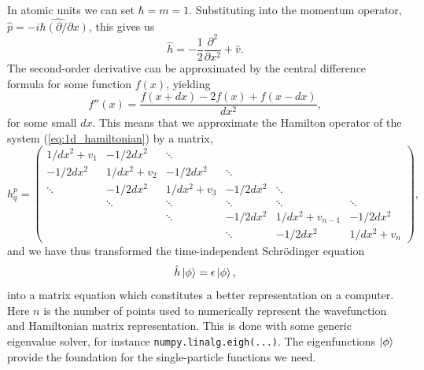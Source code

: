 In atomic units we can set $\hbar = m = 1$. Substituting into the 
momentum operator, $\hat{p} = \hat{-i\hbar (\partial / \partial x)}$, this gives us 
\begin{equation}
    \label{eq:1d_hamiltonian}
    \hat{h} = - \frac{1}{2} \frac{\partial^2}{\partial x^2} + \hat{v}.
\end{equation}
The second-order derivative can be approximated by the central difference 
formula for some function $f(x)$, yielding
\begin{equation}
    f''(x) = \frac{f(x + dx) - 2f(x) +f(x - dx)}{dx^2},
\end{equation}
for some small $dx$. This means that we approximate the Hamilton 
operator of the system (\autoref{eq:1d_hamiltonian}) by a matrix,
\begin{equation}
    h^p_q =  \begin{pmatrix}
    1/dx^2 + v_1 & -1/2dx^2 & \ddots & & & \\
    -1/2dx^2 & 1/dx^2 + v_2 & -1/2dx^2 & \ddots & & \\
    \ddots & -1/2dx^2 & 1/dx^2 + v_3 & -1/2dx^2 & \ddots & \\
    & \ddots & \ddots & \ddots & \ddots & \ddots \\
    & & \ddots & -1/2dx^2 & 1/dx^2 + v_{n-1} & -1/2dx^2 \\
    & & & \ddots & -1/2dx^2 & 1/dx^2 + v_n
    \end{pmatrix},
\end{equation}
and we have thus transformed the time-independent Schrödinger equation
\begin{equation}
    \hat{h} \ket{\phi} = \epsilon \ket{\phi},
\end{equation}
into a matrix equation which constitutes a better representation on 
a computer. Here $n$ is 
the number of points used to numerically represent the wavefunction 
and Hamiltonian matrix representation. This is done with some generic 
eigenvalue solver, for instance \lstinline{numpy.linalg.eigh(...)}.
The eigenfunctions $\ket{\phi}$ provide the foundation for the single-particle functions
we need.

